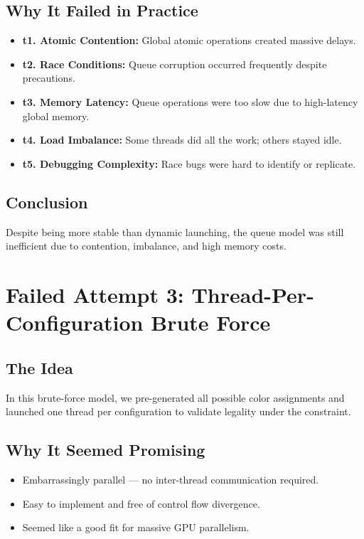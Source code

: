 \documentclass[12pt]{article}
\begin{document}
\subsection*{Why It Failed in Practice}
\begin{itemize}
    \item \textbf{t1. Atomic Contention:} Global atomic operations created massive delays.
    \item \textbf{t2. Race Conditions:} Queue corruption occurred frequently despite precautions.
    \item \textbf{t3. Memory Latency:} Queue operations were too slow due to high-latency global memory.
    \item \textbf{t4. Load Imbalance:} Some threads did all the work; others stayed idle.
    \item \textbf{t5. Debugging Complexity:} Race bugs were hard to identify or replicate.
\end{itemize}

\subsection*{Conclusion}
Despite being more stable than dynamic launching, the queue model was still inefficient due to contention, imbalance, and high memory costs.

\section*{Failed Attempt 3: Thread-Per-Configuration Brute Force}

\subsection*{The Idea}
In this brute-force model, we pre-generated all possible color assignments and launched one thread per configuration to validate legality under the constraint.

\subsection*{Why It Seemed Promising}
\begin{itemize}
    \item Embarrassingly parallel — no inter-thread communication required.
    \item Easy to implement and free of control flow divergence.
    \item Seemed like a good fit for massive GPU parallelism.
\end{itemize}
\end{document}
